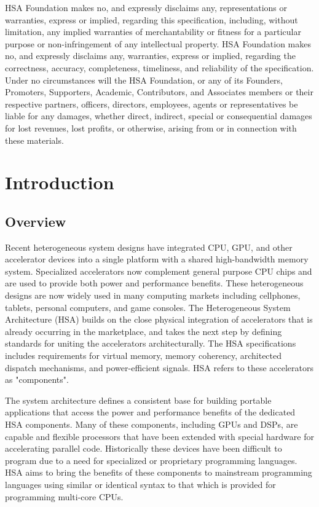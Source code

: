 \documentclass[final]{book}
\begin{document}
HSA Foundation makes no, and expressly disclaims any, representations or
warranties, express or implied, regarding this specification, including, without
limitation, any implied warranties of merchantability or fitness for a
particular purpose or non-infringement of any intellectual property. HSA
Foundation makes no, and expressly disclaims any, warranties, express or
implied, regarding the correctness, accuracy, completeness, timeliness, and
reliability of the specification. Under no circumstances will the HSA
Foundation, or any of its Founders, Promoters, Supporters, Academic,
Contributors, and Associates members or their respective partners, officers,
directors, employees, agents or representatives be liable for any damages,
whether direct, indirect, special or consequential damages for lost revenues,
lost profits, or otherwise, arising from or in connection with these materials.

\clearpage {}
\tableofcontents
\clearpage

\setcounter{page}{1}

\chapter{Introduction} \label{index}\hypertarget{index}{}
\hypertarget{overview}{}\section{Overview}\label{overview}

Recent heterogeneous system designs have integrated CPU, GPU, and other
accelerator devices into a single platform with a shared high-bandwidth memory
system.  Specialized accelerators now complement general purpose CPU chips and
are used to provide both power and performance benefits.  These
heterogeneous designs are now widely used in many computing markets including
cellphones, tablets, personal computers, and game consoles. The Heterogeneous
System Architecture (HSA) builds on the close physical integration of
accelerators that is already occurring in the marketplace, and takes the next
step by defining standards for uniting the accelerators architecturally. The HSA
specifications includes requirements for virtual memory, memory coherency,
architected dispatch mechanisms, and power-efficient signals. HSA refers to
these accelerators as "components".

The system architecture defines a consistent base for building portable
applications that access the power and performance benefits of the dedicated HSA
components. Many of these components, including GPUs and DSPs, are capable and
flexible processors that have been extended with special hardware for
accelerating parallel code. Historically these devices have been difficult to
program due to a need for specialized or proprietary programming languages. HSA
aims to bring the benefits of these components to mainstream programming
languages using similar or identical syntax to that which is provided for
programming multi-core CPUs.
\end{document}
